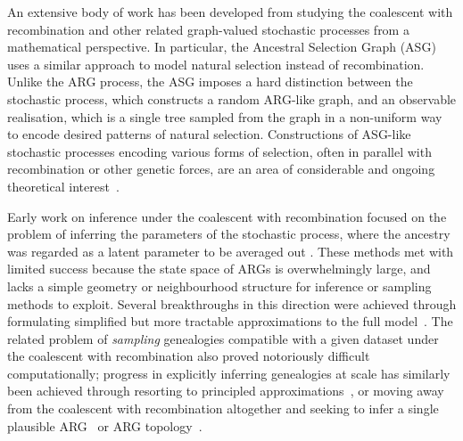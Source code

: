 \documentclass{article}
\begin{document}
An extensive body of work has been developed from
studying the coalescent with recombination
and other related
graph-valued stochastic processes from a mathematical perspective.
In particular, the Ancestral Selection Graph
(ASG)~\citep{krone1997ancestral,neuhauser1997genealogy}
uses a similar approach to model natural selection instead of recombination.
Unlike the ARG process, the ASG imposes a hard distinction between the stochastic process,
which constructs a random ARG-like graph, and an observable realisation,
which is a single tree sampled from the graph in a non-uniform way to encode
desired patterns of natural selection.
Constructions of ASG-like stochastic processes encoding various
forms of selection, often in parallel with recombination or other genetic forces,
are an area of considerable and ongoing theoretical interest~\citep[e.g.][]{
neuhauser1999ancestral,
donnelly1999genealogical,
fearnhead2001perfect,
fearnhead2003ancestral,
etheridge2009coalescent,
gonzalezcasanova2018duality,
koskela2019robust}.

Early work on inference under the coalescent with recombination
focused on the problem of
inferring the parameters of the
stochastic process, where the ancestry was regarded as a
latent parameter to be averaged out
\citep[e.g.][]{griffiths1996ancestral,kuhner2000maximum, nielsen2000estimation,
fearnhead2001estimating}.
These methods met with limited success
because the state space of ARGs is overwhelmingly large, and
lacks a simple geometry or neighbourhood structure for inference or
sampling methods to  exploit.
Several breakthroughs in this direction were achieved through
formulating simplified but more tractable approximations to the full
model~\citep{mcvean2005approximating,marjoram2006fast,li2011inference,
paul2011accurate,schiffels2014inferring}.
The related problem of \emph{sampling} genealogies compatible with a given
dataset under the coalescent with recombination also proved notoriously difficult
computationally; progress in explicitly inferring genealogies at scale
has similarly been achieved through resorting to principled
approximations~\citep{rasmussen2014genome,mahmoudi2022bayesian},
or moving away from the coalescent with recombination altogether and seeking
to infer a single plausible ARG~\citep[e.g.][]{speidel2019method} or ARG
topology~\citep[e.g.][]{minichiello2006mapping,kelleher2019inferring}.
\end{document}
